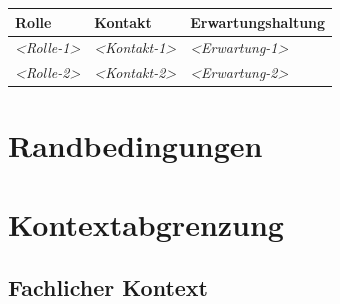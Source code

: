 \documentclass[
]{article}
\begin{document}
\begin{longtable}[]{@{}lll@{}}
\toprule
\begin{minipage}[b]{0.23\columnwidth}\raggedright
Rolle\strut
\end{minipage} & \begin{minipage}[b]{0.23\columnwidth}\raggedright
Kontakt\strut
\end{minipage} & \begin{minipage}[b]{0.46\columnwidth}\raggedright
Erwartungshaltung\strut
\end{minipage}\tabularnewline
\midrule
\endhead
\begin{minipage}[t]{0.23\columnwidth}\raggedright
\emph{\textless Rolle-1\textgreater{}}\strut
\end{minipage} & \begin{minipage}[t]{0.23\columnwidth}\raggedright
\emph{\textless Kontakt-1\textgreater{}}\strut
\end{minipage} & \begin{minipage}[t]{0.46\columnwidth}\raggedright
\emph{\textless Erwartung-1\textgreater{}}\strut
\end{minipage}\tabularnewline
\begin{minipage}[t]{0.23\columnwidth}\raggedright
\emph{\textless Rolle-2\textgreater{}}\strut
\end{minipage} & \begin{minipage}[t]{0.23\columnwidth}\raggedright
\emph{\textless Kontakt-2\textgreater{}}\strut
\end{minipage} & \begin{minipage}[t]{0.46\columnwidth}\raggedright
\emph{\textless Erwartung-2\textgreater{}}\strut
\end{minipage}\tabularnewline
\bottomrule
\end{longtable}

\hypertarget{section-architecture-constraints}{%
\section{Randbedingungen}\label{section-architecture-constraints}}

\hypertarget{section-system-scope-and-context}{%
\section{Kontextabgrenzung}\label{section-system-scope-and-context}}

\hypertarget{_fachlicher_kontext}{%
\subsection{Fachlicher Kontext}\label{_fachlicher_kontext}}
\end{document}

